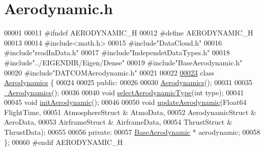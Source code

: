 \hypertarget{_aerodynamic_8h_source}{}\section{Aerodynamic.\+h}
\label{_aerodynamic_8h_source}

\begin{DoxyCode}
00001 
00011 \textcolor{preprocessor}{#ifndef AERODYNAMIC\_H}
00012 \textcolor{preprocessor}{#define AERODYNAMIC\_H}
00013 
00014 \textcolor{preprocessor}{#include<math.h>}
00015 \textcolor{preprocessor}{#include"DataCloud.h"}
00016 \textcolor{preprocessor}{#include"readInData.h"}
00017 \textcolor{preprocessor}{#include"IndependetDataTypes.h"}
00018 \textcolor{preprocessor}{#include"../EIGENDIR/Eigen/Dense"}
00019 \textcolor{preprocessor}{#include"BaseAerodynamic.h"}
00020 \textcolor{preprocessor}{#include"DATCOMAerodynamic.h"}
00021 
00022 
\hyperlink{group___aerodynamic}{00023} \textcolor{keyword}{class }\hyperlink{group___aerodynamic_class_aerodynamics}{Aerodynamics} \{
00024 
00025 \textcolor{keyword}{public}:
00026 
00030     \hyperlink{group___aerodynamic_a36c7ae850ce18605cdbf3ce1709d8e54}{Aerodynamics}();
00031 
00035     \hyperlink{group___aerodynamic_af0e048e0c80ec8334997b79b761fea60}{~Aerodynamics}();
00036 
00040     \textcolor{keywordtype}{void} \hyperlink{group___aerodynamic_a9aa3397e8b1d91ed237146a57bbe6bcf}{selectAerodynamicType}(\textcolor{keywordtype}{int} type);
00041 
00045     \textcolor{keywordtype}{void} \hyperlink{group___aerodynamic_a2382a1b24c0b3948629103747cce3db1}{initAerodynamic}();
00046 
00050     \textcolor{keywordtype}{void} \hyperlink{group___aerodynamic_adf6047b063022ff3b689e269d2b35863}{updateAerodynamic}(Float64 FlightTime,
00051                             AtmosphereStruct & AtmoData,
00052                             AerodynamicStruct & AeroData,
00053                             AirframeStruct & AirframeData,
00054                             ThrustStruct & ThrustData);
00055 
00056 \textcolor{keyword}{private}:
00057     \hyperlink{group___aerodynamic_class_base_aerodynamic}{BaseAerodynamic} * aerodynamic;
00058 \};
00060 \textcolor{preprocessor}{#endif  AERODYNAMIC\_H}
\end{DoxyCode}
